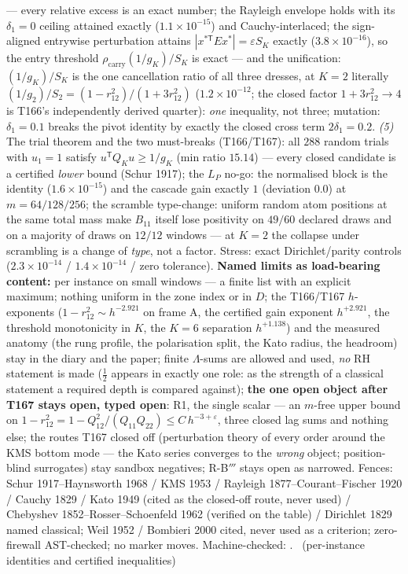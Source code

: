 \documentclass[11pt,a4paper]{article}
\begin{document}
--- every relative excess is an exact number; the Rayleigh envelope
holds with its $\delta_1=0$ ceiling attained exactly
($1.1\times10^{-15}$) and Cauchy-interlaced; the sign-aligned entrywise
perturbation attains $|x^{*\mathsf T}Ex^*|=\varepsilon S_K$ exactly
($3.8\times10^{-16}$), so the entry threshold
$\rho_{\mathrm{carry}}(1/g_K)/S_K$ is exact --- and the unification:
$(1/g_K)/S_K$ is the one cancellation ratio of all three dresses, at
$K=2$ literally $(1/g_2)/S_2=(1-r_{12}^2)/(1+3r_{12}^2)$
($1.2\times10^{-12}$; the closed factor $1+3r_{12}^2\to4$ is T166's
independently derived quarter): \emph{one} inequality, not three;
mutation: $\delta_1=0.1$ breaks the pivot identity by exactly the
closed cross term $2\delta_1=0.2$. \emph{(5)} The trial theorem and the
two must-breaks (T166/T167): all $288$ random trials with $u_1=1$
satisfy $u^{\mathsf T}Q_Ku\ge1/g_K$ (min ratio $15.14$) --- every
closed candidate is a certified \emph{lower} bound (Schur 1917); the
$L_P$ no-go: the normalised block is the identity
($1.6\times10^{-15}$) and the cascade gain exactly $1$ (deviation
$0.0$) at $m=64/128/256$; the scramble type-change: uniform random
atom positions at the same total mass make $B_{11}$ itself lose
positivity on $49/60$ declared draws and on a majority of draws on
$12/12$ windows --- at $K=2$ the collapse under scrambling is a change
of \emph{type}, not a factor. Stress: exact Dirichlet/parity controls
($2.3\times10^{-14}$ / $1.4\times10^{-14}$ / zero tolerance).
\textbf{Named limits as load-bearing content:} per instance on small
windows --- a finite list with an explicit maximum; nothing uniform in
the zone index or in $D$; the T166/T167 $h$-exponents
($1-r_{12}^2\sim h^{-2.921}$ on frame A, the certified gain exponent
$h^{+2.921}$, the threshold monotonicity in $K$, the $K=6$ separation
$h^{+1.138}$) and the measured anatomy (the rung profile, the
polarisation split, the Kato radius, the headroom) stay in the diary
and the paper; finite $\Lambda$-sums are allowed and used, \emph{no} RH
statement is made ($\tfrac12$ appears in exactly one role: as the
strength of a classical statement a required depth is compared
against); \textbf{the one open object after T167 stays open, typed
open}: R1, the single scalar --- an $m$-free upper bound on
$1-r_{12}^2=1-Q_{12}^2/(Q_{11}Q_{22})\le C\,h^{-3+\varepsilon}$, three
closed lag sums and nothing else; the routes T167 closed off
(perturbation theory of every order around the KMS bottom mode --- the
Kato series converges to the \emph{wrong} object; position-blind
surrogates) stay sandbox negatives; R-B$'''$ stays open as narrowed.
Fences: Schur 1917--Haynsworth 1968 / KMS 1953 / Rayleigh
1877--Courant--Fischer 1920 / Cauchy 1829 / Kato 1949 (cited as the
closed-off route, never used) / Chebyshev 1852--Rosser--Schoenfeld 1962
(verified on the table) / Dirichlet 1829 named classical; Weil 1952 /
Bombieri 2000 cited, never used as a criterion; zero-firewall
AST-checked; no marker moves.
Machine-checked: .
\mE\ (per-instance identities and certified inequalities)
\end{document}
